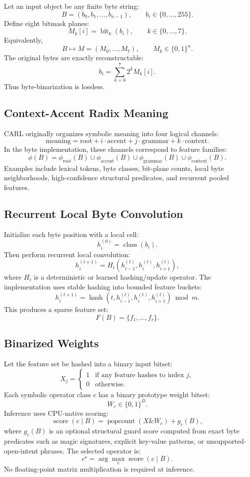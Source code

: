 \documentclass[10pt]{article}
\newcommand{\CARL}{\textsc{CARL}}
\newcommand{\popcount}{\operatorname{popcount}}
\newcommand{\bits}{\{0,1\}}
\newcommand{\score}{\operatorname{score}}
\begin{document}
Let an input object be any finite byte string:
\[
B = (b_0,b_1,\ldots,b_{n-1}), \qquad b_i \in \{0,\ldots,255\}.
\]
Define eight bitmask planes:
\[
M_k[i] = \operatorname{bit}_k(b_i), \qquad k \in \{0,\ldots,7\}.
\]
Equivalently,
\[
B \mapsto M = (M_0,\ldots,M_7), \qquad M_k \in \bits^n.
\]
The original bytes are exactly reconstructable:
\[
b_i = \sum_{k=0}^{7} 2^k M_k[i].
\]
Thus byte-binarization is lossless.

\subsection{Context-Accent Radix Meaning}

\CARL{} originally organizes symbolic meaning into four logical channels:
\[
\text{meaning} = \text{root} + i\cdot \text{accent} + j\cdot \text{grammar} + k\cdot \text{context}.
\]
In the byte implementation, these channels correspond to feature families:
\[
\phi(B) =
\phi_{\text{root}}(B)
\cup
\phi_{\text{accent}}(B)
\cup
\phi_{\text{grammar}}(B)
\cup
\phi_{\text{context}}(B).
\]
Examples include lexical tokens, byte classes, bit-plane counts, local byte neighborhoods, high-confidence structural predicates, and recurrent pooled features.

\subsection{Recurrent Local Byte Convolution}

Initialize each byte position with a local cell:
\[
h_i^{(0)} = \operatorname{class}(b_i).
\]
Then perform recurrent local convolution:
\[
h_i^{(t+1)}
=
H_t(h_{i-1}^{(t)}, h_i^{(t)}, h_{i+1}^{(t)}),
\]
where \(H_t\) is a deterministic or learned hashing/update operator. The implementation uses stable hashing into bounded feature buckets:
\[
h_i^{(t+1)}
=
\operatorname{hash}(t,h_{i-1}^{(t)},h_i^{(t)},h_{i+1}^{(t)}) \bmod m.
\]
This produces a sparse feature set:
\[
F(B) = \{f_1,\ldots,f_r\}.
\]

\subsection{Binarized Weights}

Let the feature set be hashed into a binary input bitset:
\[
X_j =
\begin{cases}
1 & \text{if any feature hashes to index } j,\\
0 & \text{otherwise}.
\end{cases}
\]
Each symbolic operator class \(c\) has a binary prototype weight bitset:
\[
W_c \in \bits^D.
\]
Inference uses CPU-native scoring:
\[
\score(c\mid B) = \popcount(X \& W_c) + g_c(B),
\]
where \(g_c(B)\) is an optional structural guard score computed from exact byte predicates such as magic signatures, explicit key-value patterns, or unsupported-open-intent phrases. The selected operator is:
\[
c^\star = \arg\max_c \score(c\mid B).
\]
No floating-point matrix multiplication is required at inference.
\end{document}

